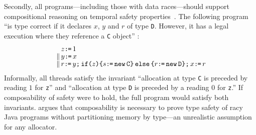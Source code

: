 Secondly, all programs---including those with data races---should support compositional reasoning on temporal safety properties~\cite{PnueliSafety,Misra:1981:PNP:1313338.1313770,StarkSafety,Abadi:1993:CS:151646.151649}.
The following program ``is type correct if it declares $x$, $y$ and $r$ of type \texttt{D}. However, it has a legal execution where they reference a \texttt{C} object'' \citep[Fig.~8]{DBLP:journals/toplas/Lochbihler13}:
\begin{gather}
  \label{lochbihler}
  \begin{aligned}
    &z \texttt{:}\mkern-1mu\texttt{=}\, 1
    \\[-1ex]
    \,\mathbin{\|}\,&
    y\texttt{:}\mkern-1mu\texttt{=}\, x
    \\[-1ex]
    \,\mathbin{\|}\,&
    r\texttt{:}\mkern-1mu\texttt{=}\, y \texttt{;}\,\allowbreak \texttt{if}\allowbreak\texttt{(}z\texttt{)} \allowbreak\texttt{\{} s \texttt{:}\mkern-1mu\texttt{=}\, \texttt{new}\, \texttt{C} \texttt{\}}\,\allowbreak\texttt{else}\allowbreak\,\texttt{\{} r \texttt{:}\mkern-1mu\texttt{=}\, \texttt{new}\, \texttt{D} \texttt{\}}  \texttt{;}\,\allowbreak x \texttt{:}\mkern-1mu\texttt{=}\, r 
  \end{aligned}
\end{gather}
 Informally, all threads satisfy the invariant ``allocation at type \texttt{C} is preceded by reading $1$ for \texttt{z}'' and ``allocation at type \texttt{D} is preceded by a reading $0$ for \texttt{z}.''  If composability of safety were to hold, the full program would satisfy both invariants.
\citeauthor{DBLP:journals/toplas/Lochbihler13} argues that composability is necessary to prove type safety of racy Java programs without partitioning memory by type---an unrealistic assumption for any allocator. %

